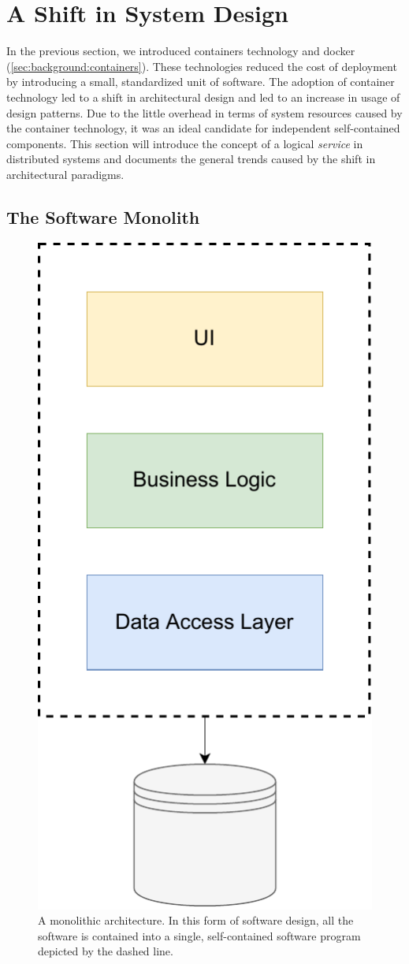 \section{A Shift in System Design}
\label{sec:background:soa}

In the previous section, we introduced \glspl{container} technology and \Gls{docker} (\cref{sec:background:containers}). These technologies reduced the cost of deployment by introducing a small, standardized unit of software. The adoption of container technology led to a shift in architectural design and led to an increase in usage of  design patterns. Due to the little overhead in terms of system resources caused by the \gls{container} technology, it was an ideal candidate for independent self-contained components. This section will introduce the concept of a logical \textit{service} in distributed systems and documents the general trends caused by the shift in architectural paradigms.

\subsection{The Software Monolith}
\label{sec:background:soa:monolith}

\begin{figure}[!t]
    \centering
    
    \includegraphics[width=0.3\linewidth]{2_background/figures/monolith-architecture.pdf}

    \caption[A monolithic software architecture.]{A monolithic architecture. In this form of software design, all the software is contained into a single, self-contained software program depicted by the dashed line. }
    \label{fig:monolithic-architecture}
\end{figure}


